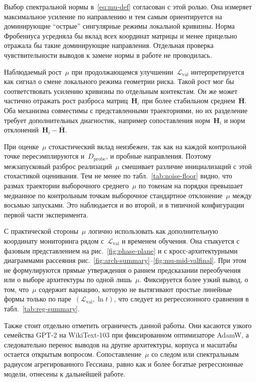 \documentclass[11pt]{ubs}
\begin{document}
Выбор спектральной нормы в~\eqref{eq:mu-def} согласован с этой ролью.
Она измеряет максимальное усиление по направлению и тем самым ориентируется на доминирующие ``острые'' сингулярные режимы локальной кривизны.
Норма Фробениуса усредняла бы вклад всех координат матрицы и менее прицельно отражала бы такие доминирующие направления.
Отдельная проверка чувствительности выводов к замене нормы в работе не проводилась.

Наблюдаемый рост~$\mu$ при продолжающемся улучшении~$\mathcal{L}_{\mathrm{val}}$ интерпретируется как сигнал о смене локального режима геометрии риска.
Такой рост мог бы соответствовать усилению кривизны по отдельным контекстам.
Он же может частично отражать рост разброса матриц~$\mathbf{H}_i$ при более стабильном среднем~$\bar{\mathbf{H}}$.
Оба механизма совместимы с представленными траекториями, но их разделение требует дополнительных диагностик, например сопоставления норм~$\mathbf{H}_i$ и норм отклонений~$\mathbf{H}_i-\bar{\mathbf{H}}$.

При оценке~$\mu$ стохастический вклад неизбежен, так как на каждой контрольной точке пересэмплируются и~$D_{\mathrm{probe}}$, и пробные направления.
Поэтому межзапусковый разброс реализаций~$\mu$ смешивает различие инициализаций с этой стохастикой оценивания.
Тем не менее по табл.~\ref{tab:noise-floor} видно, что размах траектории выборочного среднего~$\mu$ по токенам на порядки превышает медианное по контрольным точкам выборочное стандартное отклонение~$\mu$ между восьмью запусками.
Это наблюдается и во второй, и в типичной конфигурации первой части эксперимента.

С практической стороны~$\mu$ логично использовать как дополнительную координату мониторинга рядом с~$\mathcal{L}_{\mathrm{val}}$ и временем обучения.
Она стыкуется с фазовым представлением на рис.~\ref{fig:phase-plane} и с кросс-архитектурными диаграммами рассеяния рис.~\ref{fig:arch-summary}--\ref{fig:mu-mid-valfinal}.
При этом не формулируются прямые утверждения о раннем предсказании переобучения или о выборе архитектуры по одной лишь~$\mu$.
Фиксируется более узкий вывод, о том, что~$\mu$ содержит вариацию, которую не вытягивают простые линейные формы только по паре~$(\mathcal{L}_{\mathrm{val}},\ln t)$, что следует из регрессионного сравнения в табл.~\ref{tab:reg-summary}.

Также стоит отдельно отметить ограничесть данной работы.
Они касаются узкого семейства GPT-2 на WikiText-103 при фиксированном оптимизаторе AdamW, а следовательно перенос выводов на другие архитектуры, корпуса и масштабы остается открытым вопросом.
Сопоставление~$\mu$ со следом или спектральным радиусом агрегированного Гессиана, равно как и более богатые регрессионные модели, отнесены к дальнейшей работе.
\end{document}
